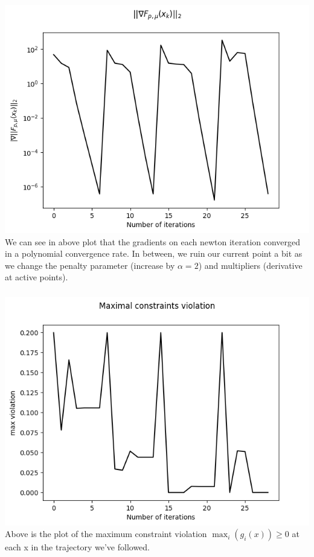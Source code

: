 \documentclass[12pt]{article}
\begin{document}
\subsubsection{}
\includegraphics[scale=0.5]{hw4/plots/plot_3.png}\\
We can see in above plot that the gradients on each newton iteration converged in a polynomial convergence rate. In between, we ruin our current point a bit as we change the penalty parameter (increase by $\alpha=2$) and multipliers (derivative at active points).\\

\subsubsection{}
\includegraphics[scale=0.5]{hw4/plots/plot_4.png}\\
Above is the plot of the maximum constraint violation $\max_i(g_i(x)) \geq 0$ at each x in the trajectory we've followed.\\
\end{document}
